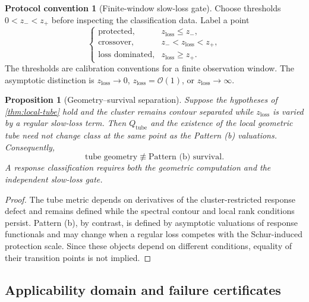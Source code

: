 \documentclass[11pt]{article}
\newtheorem{proposition}[theorem]{Proposition}
\theoremstyle{definition}
\newtheorem{protocol}[theorem]{Protocol convention}
\theoremstyle{remark}
\begin{document}
\begin{protocol}[Finite-window slow-loss gate]\label{prot:slow-loss-gate}
Choose thresholds $0<z_-<z_+$ before inspecting the classification data. Label a point
\begin{equation}
\begin{cases}
\text{protected}, & z_{\mathrm{loss}}\le z_-,\\
\text{crossover}, & z_-<z_{\mathrm{loss}}<z_+,\\
\text{loss dominated}, & z_{\mathrm{loss}}\ge z_+.
\end{cases}
\label{eq:slow-loss-gate}
\end{equation}
The thresholds are calibration conventions for a finite observation window. The asymptotic distinction is $z_{\mathrm{loss}}\to0$, $z_{\mathrm{loss}}=\mathcal O(1)$, or $z_{\mathrm{loss}}\to\infty$.
\end{protocol}

\begin{proposition}[Geometry--survival separation]\label{prop:geometry-survival}
Suppose the hypotheses of \cref{thm:local-tube} hold and the cluster remains contour separated while $z_{\mathrm{loss}}$ is varied by a regular slow-loss term. Then $Q_{\mathrm{tube}}$ and the existence of the local geometric tube need not change class at the same point as the Pattern (b) valuations. Consequently,
\begin{equation}
\boxed{
\text{tube geometry}
\not\equiv
\text{Pattern (b) survival}.
}
\label{eq:geometry-not-survival}
\end{equation}
A response classification requires both the geometric computation and the independent slow-loss gate.
\end{proposition}

\begin{proof}
The tube metric depends on derivatives of the cluster-restricted response defect and remains defined while the spectral contour and local rank conditions persist. Pattern (b), by contrast, is defined by asymptotic valuations of response functionals and may change when a regular loss competes with the Schur-induced protection scale. Since these objects depend on different conditions, equality of their transition points is not implied.
\end{proof}

\subsection{Applicability domain and failure certificates}
\end{document}
